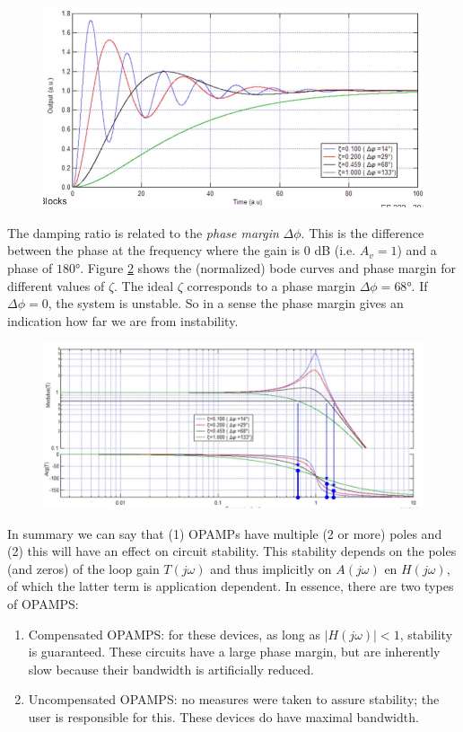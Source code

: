 \begin{figure}[h!]
	\centering
	\includegraphics[width=14cm]{figures/ch10/feedback11.jpg}
	\caption{}
	\label{fig:feedback11}
\end{figure}
The damping ratio is related to the \emph{phase margin} $\Delta \phi$. This is the difference between the phase at the frequency where the gain is 0 dB (i.e. $A_v = 1$) and a phase of $180$°. Figure \ref{fig:feedback12} shows the (normalized) bode curves and phase margin for different values of $\zeta$. The ideal $\zeta$ corresponds to a phase margin $\Delta \phi = 68$°. If $\Delta \phi = 0$, the system is unstable. So in a sense the phase margin gives an indication how far we are from instability.

\begin{figure}[h!]
	\centering
	\includegraphics[width=14cm]{figures/ch10/feedback12.jpg}
	\caption{}
	\label{fig:feedback12}
\end{figure}

In summary we can say that (1) OPAMPs have multiple (2 or more) poles and (2) this will have an effect on circuit stability. This stability depends on the poles (and zeros) of the loop gain $T(j\omega)$ and thus implicitly on $A(j\omega)$ en $H(j\omega)$, of which the latter term is application dependent. In essence, there are two types of OPAMPS:
\begin{enumerate}
	\item Compensated OPAMPS: for these devices, as long as $|H(j\omega)| < 1$, stability is guaranteed. These circuits have a large phase margin, but are inherently slow because their bandwidth is artificially reduced.
	\item Uncompensated OPAMPS: no measures were taken to assure stability; the user is responsible for this. These devices do have maximal bandwidth.
\end{enumerate}